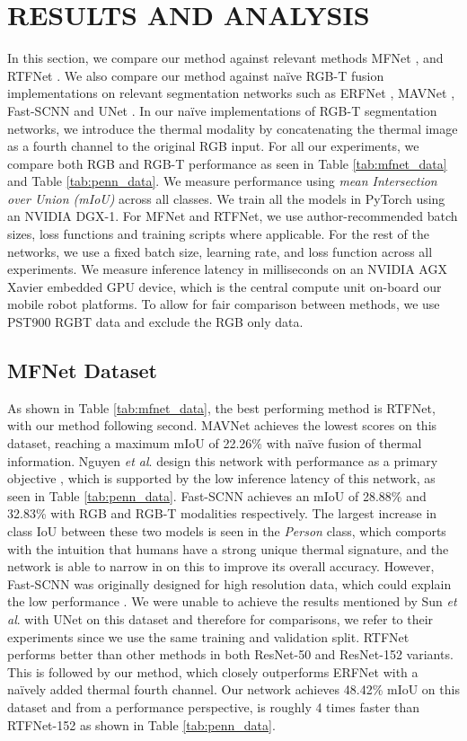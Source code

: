 \documentclass[letterpaper, 10 pt, conference]{ieeeconf}
\newcommand{\etal}{\textit{et al}. }
\begin{document}
\section{RESULTS AND ANALYSIS}

In this section, we compare our method against relevant methods MFNet \cite{ha2017mfnet}, and RTFNet \cite{sun2019rtfnet}. We also compare our method against na\"ive RGB-T fusion implementations on relevant segmentation networks such as ERFNet \cite{romera2017erfnet}, MAVNet \cite{mavnet}, Fast-SCNN \cite{poudel2019fast} and UNet \cite{ronneberger2015u}. In our na\"ive implementations of RGB-T segmentation networks, we introduce the thermal modality by concatenating the thermal image as a fourth channel to the original RGB input. For all our experiments, we compare both RGB and RGB-T performance as seen in Table \ref{tab:mfnet_data} and Table \ref{tab:penn_data}. We measure performance using \textit{mean Intersection over Union (mIoU)} across all classes. We train all the models in PyTorch using an NVIDIA DGX-1. For MFNet and RTFNet, we use author-recommended batch sizes, loss functions and training scripts where applicable. For the rest of the networks, we use a fixed batch size, learning rate, and loss function across all experiments. We measure inference latency in milliseconds on an NVIDIA AGX Xavier embedded GPU device, which is the central compute unit on-board our mobile robot platforms. To allow for fair comparison between methods, we use PST900 RGBT data and exclude the RGB only data.

\subsection{MFNet Dataset}

As shown in Table \ref{tab:mfnet_data}, the best performing method is RTFNet, with our method following second. MAVNet achieves the lowest scores on this dataset, reaching a maximum mIoU of 22.26\% with na\"ive fusion of thermal information. Nguyen \etal design this network with performance as a primary objective \cite{mavnet}, which is supported by the low inference latency of this network, as seen in Table \ref{tab:penn_data}. Fast-SCNN achieves an mIoU of 28.88\% and 32.83\% with RGB and RGB-T modalities respectively. The largest increase in class IoU between these two models is seen in the \textit{Person} class, which comports with the intuition that humans have a strong unique thermal signature, and the network is able to narrow in on this to improve its overall accuracy. However, Fast-SCNN was originally designed for high resolution data, which could explain the low performance \cite{poudel2019fast}. We were unable to achieve the results mentioned by Sun \etal with UNet on this dataset and therefore for comparisons, we refer to their experiments since we use the same training and validation split. RTFNet performs better than other methods in both ResNet-50 and ResNet-152 variants. This is followed by our method, which closely outperforms ERFNet with a na\"ively added thermal fourth channel. Our network achieves 48.42\% mIoU on this dataset and from a performance perspective, is roughly 4 times faster than RTFNet-152 as shown in Table \ref{tab:penn_data}.
\end{document}
